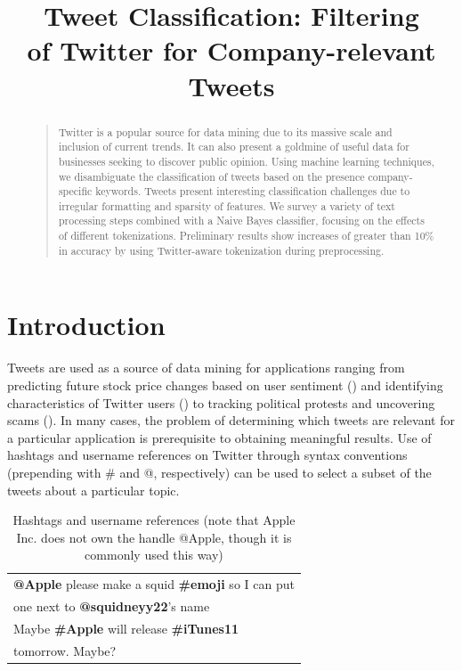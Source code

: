 \documentclass[letterpaper]{article}
\begin{document}
\title{Tweet Classification: Filtering \\ of Twitter for Company-relevant Tweets}
\maketitle

\tableofcontents

\vspace{10 mm}
\begin{abstract}
\begin{quote}
Twitter is a popular source for data mining due to its massive scale and inclusion of current trends. It can also present a goldmine of useful data for businesses seeking to discover public opinion. Using machine learning techniques, we disambiguate the classification of tweets based on the presence company-specific keywords. Tweets present interesting classification challenges due to irregular formatting and sparsity of features. 
We survey a variety of text processing steps combined with a Naive Bayes classifier, focusing on the effects of different tokenizations. Preliminary results show increases of greater than 10\% in accuracy by using Twitter-aware tokenization during preprocessing.
\end{quote}
\end{abstract}
\section{Introduction}
Tweets are used as a source of data mining for applications ranging from predicting future stock price changes based on user sentiment (\citeauthor{Ruiz}) and identifying characteristics of Twitter users (\citeauthor{conf/icwsm/PennacchiottiP11}) to tracking political protests and uncovering scams (\citeauthor{ICWSM101540}).
In many cases, the problem of determining which tweets are relevant for a particular application is prerequisite to obtaining meaningful results. Use of hashtags and username references on Twitter through syntax conventions (prepending with \# and @, respectively) can be used to select a subset of the tweets about a particular topic. 

\begin{table}[ht]
\centering
\begin{tabular}{|l|}
	\hline
\textbf{@Apple} please make a squid \textbf{\#emoji} so I can put \\
one next to \textbf{@squidneyy22}'s name\\ \hline
Maybe \textbf{\#Apple} will release \textbf{\#iTunes11} \\
tomorrow. Maybe? \\ \hline
\end{tabular}
\caption{Hashtags and username references (note that Apple Inc. does not own the handle @Apple, though it is commonly used this way)}
\label{tab:hashtag_username}
\end{table}
\end{document}
